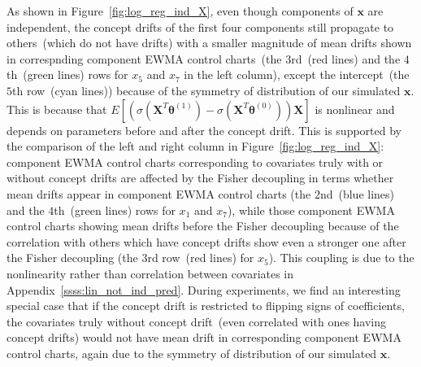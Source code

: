 \documentclass[twoside,11pt]{article}
\begin{document}
\begin{appendices}
As shown in Figure~\ref{fig:log_reg_ind_X}, even though components of $\bm {x}$ are independent, the concept drifts of the first four components still propagate to others~(which do not have drifts) with a smaller magnitude of mean drifts shown in correspnding component EWMA control charts~(the $3$rd~(red lines) and the $4$th~(green lines) rows for $x_5$ and $x_7$ in the left column), except the intercept~(the $5$th row~(cyan lines)) because of the symmetry of distribution of our simulated $\bm {x}$. This is because that $E [ (\sigma ( \bm {X}^T\bm { \theta}^{(1)} ) - \sigma ( \bm {X}^T\bm { \theta}^{(0)} )) \bm {X}] $ is nonlinear and depends on parameters before and after the concept drift. This is supported by the comparison of the left and right column in Figure~\ref{fig:log_reg_ind_X}: component EWMA control charts corresponding to covariates truly with or without concept drifts are affected by the Fisher decoupling in terms whether mean drifts appear in component EWMA control charts (the $2$nd~(blue lines) and the $4$th~(green lines) rows for $x_1$ and $x_7$), while those component EWMA control charts showing mean drifts before the Fisher decoupling because of the correlation with others which have concept drifts show even a stronger one after the Fisher decoupling (the $3$rd row~(red lines) for $x_5$). This coupling is due to the nonlinearity rather than correlation between covariates in Appendix~\ref{ssss:lin_not_ind_pred}. During experiments, we find an interesting special case that if the concept drift is restricted to flipping signs of coefficients, the covariates truly without concept drift~(even correlated with ones having concept drifts) would not have mean drift in corresponding component EWMA control charts, again due to the symmetry of distribution of our simulated $\bm {x}$.


\end{appendices}
\end{document}
